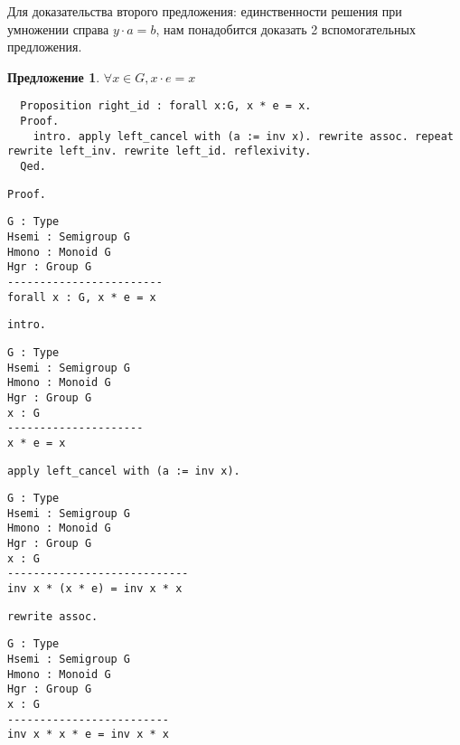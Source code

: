 \documentclass[12pt]{article}
\newcounter{thm}
\newtheorem{proposition}[thm]{Предложение}
\begin{document}
Для доказательства второго предложения: единственности решения при умножении справа $y \cdot a = b$, нам понадобится доказать 2 вспомогательных предложения.

\begin{proposition}
  $\forall x \in G, x \cdot e = x$
\end{proposition}

\begin{verbatim}
  Proposition right_id : forall x:G, x * e = x.
  Proof.
    intro. apply left_cancel with (a := inv x). rewrite assoc. repeat rewrite left_inv. rewrite left_id. reflexivity.
  Qed.
\end{verbatim}

\begin{minipage}{.46\textwidth}
\texttt{Proof.}
\begin{verbatim}
G : Type
Hsemi : Semigroup G
Hmono : Monoid G
Hgr : Group G
------------------------
forall x : G, x * e = x
\end{verbatim}
\end{minipage}
\hfill
\begin{minipage}{.46\textwidth}
\texttt{intro.}
\begin{verbatim}
G : Type
Hsemi : Semigroup G
Hmono : Monoid G
Hgr : Group G
x : G
---------------------
x * e = x
\end{verbatim}
\end{minipage}

\bigskip
\noindent\makebox[\textwidth]{\hrulefill}

\bigskip
\begin{minipage}{.46\textwidth}
\texttt{apply left_cancel with (a := inv x).}
\begin{verbatim}
G : Type
Hsemi : Semigroup G
Hmono : Monoid G
Hgr : Group G
x : G
----------------------------
inv x * (x * e) = inv x * x
\end{verbatim}
\end{minipage}
\hfill
\begin{minipage}{.46\textwidth}
\texttt{rewrite assoc.}
\begin{verbatim}
G : Type
Hsemi : Semigroup G
Hmono : Monoid G
Hgr : Group G
x : G
-------------------------
inv x * x * e = inv x * x
\end{verbatim}
\end{minipage}

\bigskip
\noindent\makebox[\textwidth]{\hrulefill}
\end{document}

